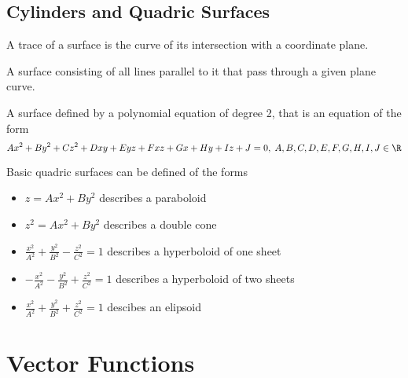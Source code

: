 \section{Cylinders and Quadric Surfaces}
\begin{definition}[Traces]
    A trace of a surface is the curve of its intersection with a coordinate plane.
\end{definition}
\begin{definition}[Cylinder]
    A surface consisting of all lines parallel to it that pass through a given plane curve.
\end{definition}
\begin{definition}
    A surface defined by a polynomial equation of degree 2, that is an equation of the form
    \[
        Ax^2+By^2+Cz^2+Dxy+Eyz+Fxz+Gx+Hy+Iz+J=0,\; A,B,C,D,E,F,G,H,I,J\in\R
    \]
\end{definition}
Basic quadric surfaces can be defined of the forms
\begin{itemize}
    \item \(z=Ax^2 +By^2\) describes a paraboloid
    \item \(z^2 =Ax^2 + By^2\) describes a double cone 
    \item \(\frac{x^2}{A^2}+\frac{y^2}{B^2}-\frac{z^2}{C^2}=1\) describes a hyperboloid of one sheet
    \item \(-\frac{x^2}{A^2}-\frac{y^2}{B^2}+\frac{z^2}{C^2}=1\) describes a hyperboloid of two sheets
    \item \(\frac{x^2}{A^2}+\frac{y^2}{B^2}+\frac{z^2}{C^2}=1\) descibes an elipsoid
\end{itemize}
\newpage
\chapter{Vector Functions}
